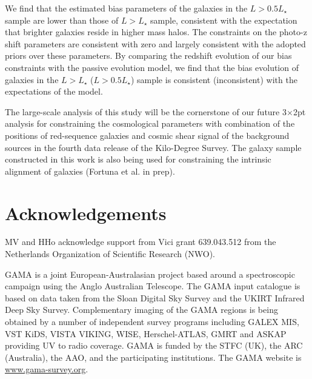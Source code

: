 \documentclass{aa}
\numberwithin{equation}{section}
\begin{document}
We find that the estimated bias parameters of the galaxies in the $L>0.5L_{\star}$ sample are lower than those of $L>L_{\star}$ sample, consistent with the expectation that brighter galaxies reside in higher mass halos. The constraints on the photo-z shift parameters are consistent with zero and largely consistent with the adopted priors over these parameters. By comparing the redshift evolution of our bias constraints with the passive evolution model, we find that the bias evolution of galaxies in the $L>L_{\star}$ ($L>0.5L_{\star}$) sample is consistent (inconsistent) with the expectations of the model. 

The large-scale analysis of this study will be the cornerstone of our future 3$\times$2pt analysis for constraining the cosmological parameters with combination of the positions of red-sequence galaxies and cosmic shear signal of the background sources in the fourth data release of the Kilo-Degree Survey. The galaxy sample constructed in this work is also being used for constraining the intrinsic alignment of galaxies (Fortuna et al. in prep).


\section*{Acknowledgements}

MV and HHo acknowledge
support from Vici grant 639.043.512 from the Netherlands
Organization of Scientific Research (NWO).

GAMA is a joint European-Australasian project based
around a spectroscopic campaign using the Anglo Australian
Telescope. The GAMA input catalogue is based on data
taken from the Sloan Digital Sky Survey and the UKIRT
Infrared Deep Sky Survey. Complementary imaging of the
GAMA regions is being obtained by a number of independent survey programs including GALEX MIS, VST
KiDS, VISTA VIKING, WISE, Herschel-ATLAS, GMRT
and ASKAP providing UV to radio coverage. GAMA is
funded by the STFC (UK), the ARC (Australia), the AAO,
and the participating institutions. The GAMA website is
\hyperlink{www.gama-survey.org}{www.gama-survey.org}.
\end{document}
